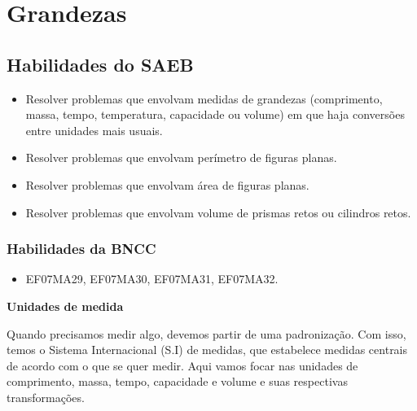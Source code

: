 
\chapter{Grandezas}

\section{Habilidades do SAEB}
\begin{itemize}
\item
  Resolver problemas que envolvam medidas de grandezas (comprimento,
  massa, tempo, temperatura, capacidade ou volume) em que haja
  conversões entre unidades mais usuais.
\item
  Resolver problemas que envolvam perímetro de figuras planas.
\item
  Resolver problemas que envolvam área de figuras planas.
\item
  Resolver problemas que envolvam volume de prismas retos ou cilindros
  retos.
\end{itemize}

\subsection{Habilidades da BNCC }
\begin{itemize}
\item EF07MA29, EF07MA30, EF07MA31, EF07MA32.
\end{itemize}


\textbf{Unidades de medida}

Quando precisamos medir algo, devemos partir de uma padronização. Com
isso, temos o Sistema Internacional (S.I) de medidas, que estabelece
medidas centrais de acordo com o que se quer medir. Aqui vamos focar nas
unidades de comprimento, massa, tempo, capacidade e volume e suas
respectivas transformações.

